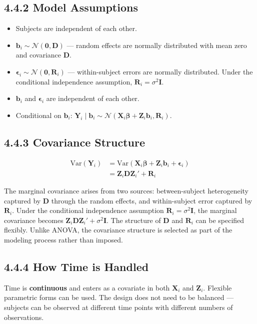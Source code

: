 \documentclass[11pt]{article}
\newcommand{\bY}{\mathbf{Y}}
\newcommand{\bX}{\mathbf{X}}
\newcommand{\bZ}{\mathbf{Z}}
\newcommand{\bbeta}{\boldsymbol{\beta}}
\newcommand{\bepsilon}{\boldsymbol{\epsilon}}
\newcommand{\Var}{\mathrm{Var}}
\newcommand{\Normal}{\mathcal{N}}
\begin{document}
\subsection*{4.4.2 Model Assumptions}

\begin{itemize}[leftmargin=2em]
  \item Subjects are independent of each other.
  \item $\mathbf{b}_i \sim \Normal(\mathbf{0}, \mathbf{D})$ --- random effects are normally distributed with mean zero and covariance $\mathbf{D}$.
  \item $\bepsilon_i \sim \Normal(\mathbf{0}, \mathbf{R}_i)$ --- within-subject errors are normally distributed. Under the conditional independence assumption, $\mathbf{R}_i = \sigma^2\mathbf{I}$.
  \item $\mathbf{b}_i$ and $\bepsilon_i$ are independent of each other.
  \item Conditional on $\mathbf{b}_i$: $\bY_i \mid \mathbf{b}_i \sim \Normal(\bX_i\bbeta + \bZ_i\mathbf{b}_i, \mathbf{R}_i)$.
\end{itemize}

\subsection*{4.4.3 Covariance Structure}

\begin{align*}
\Var(\bY_i) &= \Var(\bX_i\bbeta + \bZ_i\mathbf{b}_i + \bepsilon_i) \\
            &= \bZ_i \mathbf{D} \bZ_i' + \mathbf{R}_i
\end{align*}

The marginal covariance arises from two sources: between-subject heterogeneity captured by $\mathbf{D}$ through the random effects, and within-subject error captured by $\mathbf{R}_i$. Under the conditional independence assumption $\mathbf{R}_i = \sigma^2\mathbf{I}$, the marginal covariance becomes $\bZ_i\mathbf{D}\bZ_i' + \sigma^2\mathbf{I}$. The structure of $\mathbf{D}$ and $\mathbf{R}_i$ can be specified flexibly. Unlike ANOVA, the covariance structure is selected as part of the modeling process rather than imposed.

\subsection*{4.4.4 How Time is Handled}

Time is \textbf{continuous} and enters as a covariate in both $\bX_i$ and $\bZ_i$. Flexible parametric forms can be used. The design does not need to be balanced --- subjects can be observed at different time points with different numbers of observations.
\end{document}
